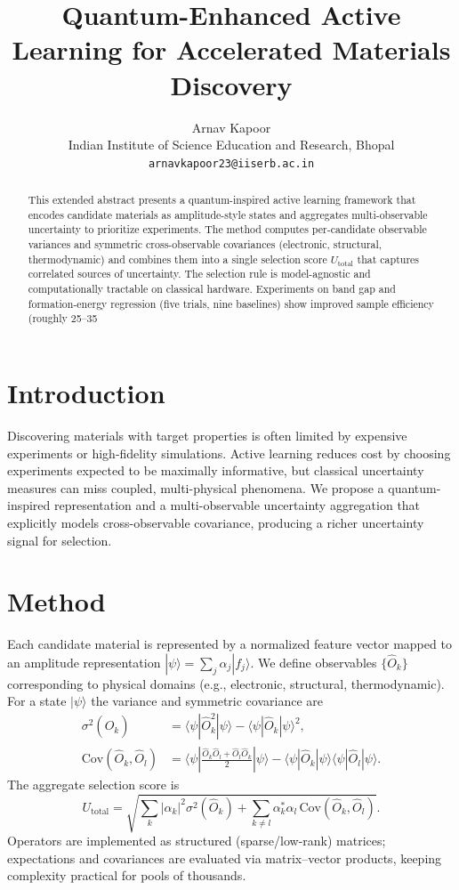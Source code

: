 \documentclass[11pt]{article}
\title{Quantum-Enhanced Active Learning for Accelerated Materials Discovery}
\author{Arnav Kapoor \\
Indian Institute of Science Education and Research, Bhopal \\
\texttt{arnavkapoor23@iiserb.ac.in}}
\date{}
\begin{document}
\maketitle

\begin{abstract}
This extended abstract presents a quantum-inspired active learning framework that encodes candidate materials as amplitude-style states and aggregates multi-observable uncertainty to prioritize experiments. The method computes per-candidate observable variances and symmetric cross-observable covariances (electronic, structural, thermodynamic) and combines them into a single selection score $U_{\mathrm{total}}$ that captures correlated sources of uncertainty. The selection rule is model-agnostic and computationally tractable on classical hardware. Experiments on band gap and formation-energy regression (five trials, nine baselines) show improved sample efficiency (roughly 25–35%
\end{abstract}

\section*{Introduction}
Discovering materials with target properties is often limited by expensive experiments or high-fidelity simulations. Active learning reduces cost by choosing experiments expected to be maximally informative, but classical uncertainty measures can miss coupled, multi-physical phenomena. We propose a quantum-inspired representation and a multi-observable uncertainty aggregation that explicitly models cross-observable covariance, producing a richer uncertainty signal for selection.

\section*{Method}
Each candidate material is represented by a normalized feature vector mapped to an amplitude representation $|\psi\rangle=\sum_j \alpha_j |f_j\rangle$. We define observables $\{\hat{O}_k\}$ corresponding to physical domains (e.g., electronic, structural, thermodynamic). For a state $|\psi\rangle$ the variance and symmetric covariance are
\begin{align}
\sigma^2(\hat{O}_k) &= \langle\psi|\hat{O}_k^2|\psi\rangle - \langle\psi|\hat{O}_k|\psi\rangle^2,\\
\mathrm{Cov}(\hat{O}_k,\hat{O}_l) &= \langle\psi|\tfrac{\hat{O}_k\hat{O}_l+\hat{O}_l\hat{O}_k}{2}|\psi\rangle - \langle\psi|\hat{O}_k|\psi\rangle\langle\psi|\hat{O}_l|\psi\rangle.
\end{align}
The aggregate selection score is
\[ U_{\mathrm{total}} = \sqrt{\sum_k |\alpha_k|^2 \sigma^2(\hat{O}_k) + \sum_{k\neq l} \alpha_k^*\alpha_l\,\mathrm{Cov}(\hat{O}_k,\hat{O}_l)}. \]
Operators are implemented as structured (sparse/low-rank) matrices; expectations and covariances are evaluated via matrix–vector products, keeping complexity practical for pools of thousands.
\end{document}
